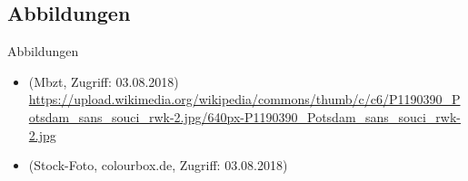 \subsection{Abbildungen}
\begin{frame}{Abbildungen}
\small

\begin{itemize}
	\item {} (Mbzt, Zugriff: 03.08.2018) \url{https://upload.wikimedia.org/wikipedia/commons/thumb/c/c6/P1190390_Potsdam_sans_souci_rwk-2.jpg/640px-P1190390_Potsdam_sans_souci_rwk-2.jpg}
	\item {} (Stock-Foto, colourbox.de, Zugriff: 03.08.2018)
\end{itemize}	

\end{frame}
